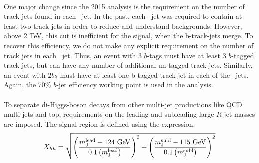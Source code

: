 \paragraph{}
One major change since the 2015 analysis is the requirement on the number of track jets found in each \largeR\ jet.  In the past, each \largeR\ jet was required to contain at least two track jets in order to reduce and understand backgrounds.  However, above 2 TeV, this cut is inefficient for the signal, when the b-track-jets merge.  To recover this efficiency, we do not make any explicit requirement on the number of track jets in each \largeR\ jet.  Thus, an event with 3 $b$-tags must have at least 3 $b$-tagged track jets, but can have any number of additional un-tagged track jets. Similarly, an event with $2bs$ must have at least one b-tagged track jet in each of the \largeR\ jets. Again, the 70\% $b$-jet efficiency working point is used in the analysis.

\paragraph{}
To separate di-Higgs-boson decays from other multi-jet productions like QCD multi-jets and top, requirements on the leading and subleading large-$R$ jet masses are imposed. The signal region is defined using the expression:
\begin{equation}
\label{eq:boosted_XhhDef}
X_{hh} = \sqrt{\left(\frac{m^{\rm lead}_{\rm J} - \text{124 GeV}}{0.1 \left(m^{\rm lead}_{\rm J}\right)}\right)^2 + \left(\frac{m^{\rm subl}_{\rm J}- \text{115 GeV}}{0.1 \left(m^{\rm subl}_{\rm J}\right)}\right)^2}
\end{equation}

